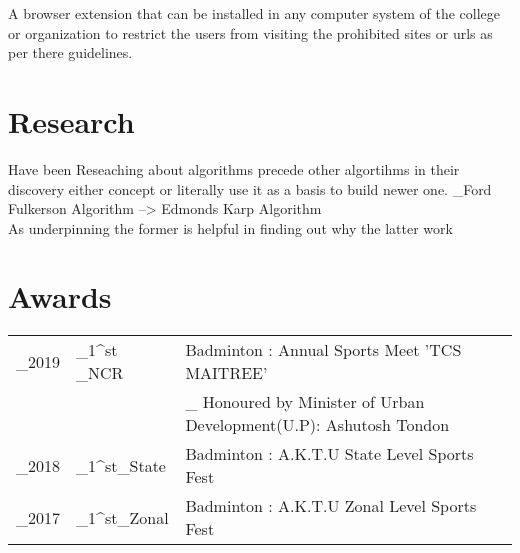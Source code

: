 \documentclass[]{deedy-resume-openfont}
\begin{document}
\begin{minipage}[t]{0.66\textwidth}
\begin{tightemize}
\end{tightemize}
\sectionsep

\vspace{\topsep} %
\begin{tightemize}
\item A browser extension that can be installed in any computer system of the college or organization to restrict the users from visiting the prohibited sites or urls as per there guidelines.

\end{tightemize}
\sectionsep


\section{Research}
\item Have been Reseaching about algorithms precede other algortihms in their discovery either concept or literally use it as a basis to build newer one.
_{Ford Fulkerson Algorithm --> Edmonds Karp Algorithm}\\
As underpinning the former is helpful in finding out why the latter work
\sectionsep


\section{Awards} 
\begin{tabular}{r l l}
_{2019} & _{1}^{st} _{NCR} & Badminton : Annual Sports Meet 'TCS MAITREE' \\
&  & _{\footnotesize{ Honoured by Minister of Urban Development(U.P): Ashutosh Tondon}}\\
_{2018} & _{1}^{st}_{State} & Badminton : A.K.T.U State Level Sports Fest \\

_{2017} & _{1}^{st}_{Zonal} & Badminton : A.K.T.U Zonal Level Sports Fest \\
\end{tabular}
\sectionsep

\end{minipage} 
\end{document}
